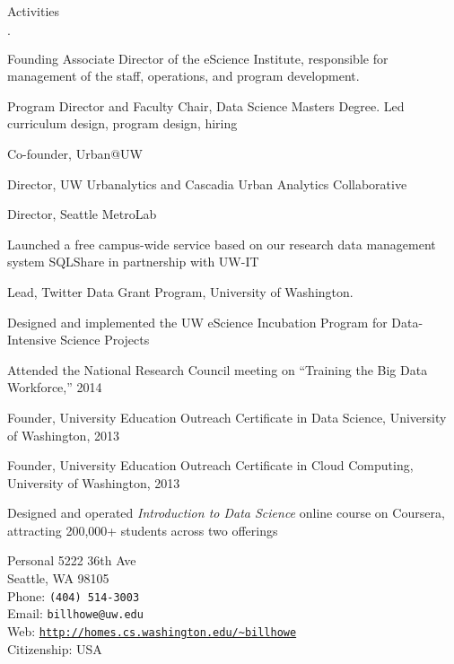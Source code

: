 \documentclass[10pt]{article}
\makeatletter
\newcommand{\phone}{{\tt (404) 514-3003}}
\newcommand{\email}{{\tt billhowe@uw.edu}}
\newcommand{\www}{{\tt \url{http://homes.cs.washington.edu/~billhowe}}}
\newcommand{\address}{5222 36th Ave \\
Seattle, WA  98105}
\newenvironment{bulletlist}
   {
      \begin{list}
         {$\cdot$}
         {
            \setlength{\itemsep}{.7ex}
            \setlength{\parsep}{0ex}
            \setlength{\leftmargin}{0.7em}
            \setlength{\parskip}{0ex}
            \setlength{\topsep}{0ex}
         }
   }
   {
      \end{list}
   }
\newcommand{\marginlabel}[1]{
\begin{minipage}[b]{0.8\labelwidth}{\large \textsf{\textbf{#1}}}\end{minipage}}
\newcommand{\entrylabel}[1]{\mbox{\marginlabel{#1}}\hfill}
\newcommand{\MainListlabel}[1]
   {
      \parbox[t]{\labelwidth}{\hspace{.8em}\marginlabel{#1}}
   }
\newenvironment{MainList}[1]
   {
      \renewcommand{\entrylabel}{\MainListlabel}
      \begin{list}{}
      {
         \renewcommand{\makelabel}{\entrylabel}
         \setlength   {\itemindent}{-.65em}
         \setlength   {\labelwidth}{#1}
         \setlength   {\leftmargin}{\labelwidth}
         \setlength   {\itemsep}{3ex}
      }
   }
   {
      \end{list}
   }
\makeatother
\begin{document}
\begin{MainList}{88pt}
\item [Activities]
\begin{bulletlist}
\item Founding Associate Director of the eScience Institute, responsible for management of the staff, operations, and program development.
\item Program Director and Faculty Chair, Data Science Masters Degree.  Led curriculum design, program design, hiring
\item Co-founder, Urban@UW
\item Director, UW Urbanalytics and Cascadia Urban Analytics Collaborative
\item Director, Seattle MetroLab
\item Launched a free campus-wide service based on our research data management system SQLShare in partnership with UW-IT
\item Lead, Twitter Data Grant Program, University of Washington.
\item Designed and implemented the UW eScience Incubation Program for Data-Intensive Science Projects
\item Attended the National Research Council meeting on ``Training the Big Data Workforce,'' 2014
\item Founder, University Education Outreach Certificate in Data Science, University of Washington, 2013
\item Founder, University Education Outreach Certificate in Cloud Computing, University of Washington, 2013
\item Designed and operated {\em Introduction to Data Science} online course on Coursera, attracting 200,000+ students across two offerings
\end{bulletlist}



\item [Personal]
\address{}\\\newline
Phone: \phone\\
Email: \email\\
Web: \www \\
Citizenship: USA\\




\end{MainList}
\end{document}
